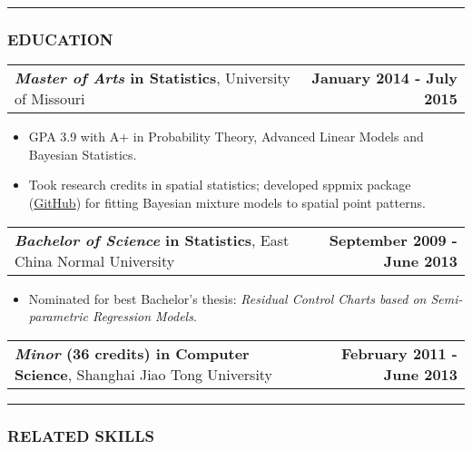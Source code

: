 \documentclass[11pt]{article}
\makeatletter
\newcommand{\headerrow}[2]
{\begin{tabular*}{\linewidth}{l@{\extracolsep{\fill}}r}
	#1 & #2 \\
\end{tabular*}
}
\makeatother
\begin{document}
\vspace{.5em}
\hrule

\subsubsection*{\centering EDUCATION}
\vspace{-.3em}

\headerrow
	{\textbf{\emph{Master of Arts} in Statistics}, University of Missouri}
	{\textbf{January 2014 - July 2015}}
	\begin{itemize}
		\item GPA 3.9 with A+ in Probability Theory, Advanced Linear Models and Bayesian Statistics.
		\item Took research credits in spatial statistics; developed sppmix package  (\href{https://github.com/wangyuchen/sppmix}{GitHub}) for fitting Bayesian mixture models to spatial point patterns.
	\end{itemize}
\noindent\headerrow
	{\textbf{\emph{Bachelor of Science} in Statistics}, East China Normal University}
	{\textbf{September 2009 - June 2013}}
	\begin{itemize}
		\item Nominated for best Bachelor's thesis: \textit{Residual Control Charts based on Semi-parametric Regression Models}.
	\end{itemize}
\noindent\headerrow
	{\textbf{\emph{Minor} (36 credits) in Computer Science}, Shanghai Jiao Tong University}
	{\textbf{February 2011 - June 2013}}


	\vspace{-.8em}
	\hrule

	\subsubsection*{\centering RELATED SKILLS}
	\vspace{-.3em}
\end{document}
